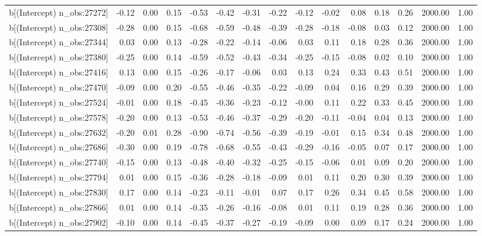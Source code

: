 \begin{table}[ht]
\begin{tabular}{rrrrrrrrrrrrrrr}
  b[(Intercept) n\_obs:27272] & -0.12 & 0.00 & 0.15 & -0.53 & -0.42 & -0.31 & -0.22 & -0.12 & -0.02 & 0.08 & 0.18 & 0.26 & 2000.00 & 1.00 \\ 
  b[(Intercept) n\_obs:27308] & -0.28 & 0.00 & 0.15 & -0.68 & -0.59 & -0.48 & -0.39 & -0.28 & -0.18 & -0.08 & 0.03 & 0.12 & 2000.00 & 1.00 \\ 
  b[(Intercept) n\_obs:27344] & 0.03 & 0.00 & 0.13 & -0.28 & -0.22 & -0.14 & -0.06 & 0.03 & 0.11 & 0.18 & 0.28 & 0.36 & 2000.00 & 1.00 \\ 
  b[(Intercept) n\_obs:27380] & -0.25 & 0.00 & 0.14 & -0.59 & -0.52 & -0.43 & -0.34 & -0.25 & -0.15 & -0.08 & 0.02 & 0.10 & 2000.00 & 1.00 \\ 
  b[(Intercept) n\_obs:27416] & 0.13 & 0.00 & 0.15 & -0.26 & -0.17 & -0.06 & 0.03 & 0.13 & 0.24 & 0.33 & 0.43 & 0.51 & 2000.00 & 1.00 \\ 
  b[(Intercept) n\_obs:27470] & -0.09 & 0.00 & 0.20 & -0.55 & -0.46 & -0.35 & -0.22 & -0.09 & 0.04 & 0.16 & 0.29 & 0.39 & 2000.00 & 1.00 \\ 
  b[(Intercept) n\_obs:27524] & -0.01 & 0.00 & 0.18 & -0.45 & -0.36 & -0.23 & -0.12 & -0.00 & 0.11 & 0.22 & 0.33 & 0.45 & 2000.00 & 1.00 \\ 
  b[(Intercept) n\_obs:27578] & -0.20 & 0.00 & 0.13 & -0.53 & -0.46 & -0.37 & -0.29 & -0.20 & -0.11 & -0.04 & 0.04 & 0.13 & 2000.00 & 1.00 \\ 
  b[(Intercept) n\_obs:27632] & -0.20 & 0.01 & 0.28 & -0.90 & -0.74 & -0.56 & -0.39 & -0.19 & -0.01 & 0.15 & 0.34 & 0.48 & 2000.00 & 1.00 \\ 
  b[(Intercept) n\_obs:27686] & -0.30 & 0.00 & 0.19 & -0.78 & -0.68 & -0.55 & -0.43 & -0.29 & -0.16 & -0.05 & 0.07 & 0.17 & 2000.00 & 1.00 \\ 
  b[(Intercept) n\_obs:27740] & -0.15 & 0.00 & 0.13 & -0.48 & -0.40 & -0.32 & -0.25 & -0.15 & -0.06 & 0.01 & 0.09 & 0.20 & 2000.00 & 1.00 \\ 
  b[(Intercept) n\_obs:27794] & 0.01 & 0.00 & 0.15 & -0.36 & -0.28 & -0.18 & -0.09 & 0.01 & 0.11 & 0.20 & 0.30 & 0.39 & 2000.00 & 1.00 \\ 
  b[(Intercept) n\_obs:27830] & 0.17 & 0.00 & 0.14 & -0.23 & -0.11 & -0.01 & 0.07 & 0.17 & 0.26 & 0.34 & 0.45 & 0.58 & 2000.00 & 1.00 \\ 
  b[(Intercept) n\_obs:27866] & 0.01 & 0.00 & 0.14 & -0.35 & -0.26 & -0.16 & -0.08 & 0.01 & 0.11 & 0.19 & 0.28 & 0.36 & 2000.00 & 1.00 \\ 
  b[(Intercept) n\_obs:27902] & -0.10 & 0.00 & 0.14 & -0.45 & -0.37 & -0.27 & -0.19 & -0.09 & 0.00 & 0.09 & 0.17 & 0.24 & 2000.00 & 1.00 \\ 

\end{tabular}
\end{table}
